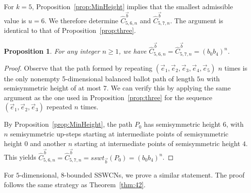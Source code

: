 \documentclass[11pt]{article}
\newtheorem{proposition}[theorem]{Proposition}
\theoremstyle{remark}
\theoremstyle{definition}
\begin{document}
For $k=5$, Proposition~\ref{prop:MinHeight} implies that the smallest admissible value is $u=6$. We therefore determine $\widehat{C}_{5,6,n}^{\vec b}$ and $\widehat{C}_{5,7,n}^{\vec b}$. The argument is identical to that of Proposition~\ref{prop:three}.

\begin{proposition}
    For any integer $n \geq 1$, we have $\widehat{C}_{5, 6, n}^{\vec{b}} = \widehat{C}_{5, 7, n}^{\vec{b}} = (b_0b_4)^n$.
\end{proposition}
\begin{proof}
    Observe that the path formed by repeating $(\vec{e}_1, \vec{e}_2, \vec{e}_3, \vec{e}_4, \vec{e}_5)$ $n$ times is the only nonempty 5-dimensional balanced ballot path of length $5n$ with semisymmetric height of at most $7$. We can verify this by applying the same argument as the one used in Proposition~\ref{prop:three} for the sequence $(\vec{e}_1, \vec{e}_2, \vec{e}_3)$ repeated $n$ times. 

    By Proposition~\ref{prop:MinHeight}, the path $P_0$ has semisymmetric height $6$, with $n$ semisymmetric up-steps starting at intermediate points of semisymmetric height $0$ and another $n$ starting at intermediate points of semisymmetric height $4$. This yields $\widehat{C}_{5,6,n}^{\vec b}=\widehat{C}_{5,7,n}^{\vec b}=sswt_{\vec b}(P_0)=(b_0b_4)^n$.
\end{proof}

For $5$-dimensional, $8$-bounded SSWCNs, we prove a similar statement. The proof follows the same
strategy as Theorem~\ref{thm:42}.
\end{document}
